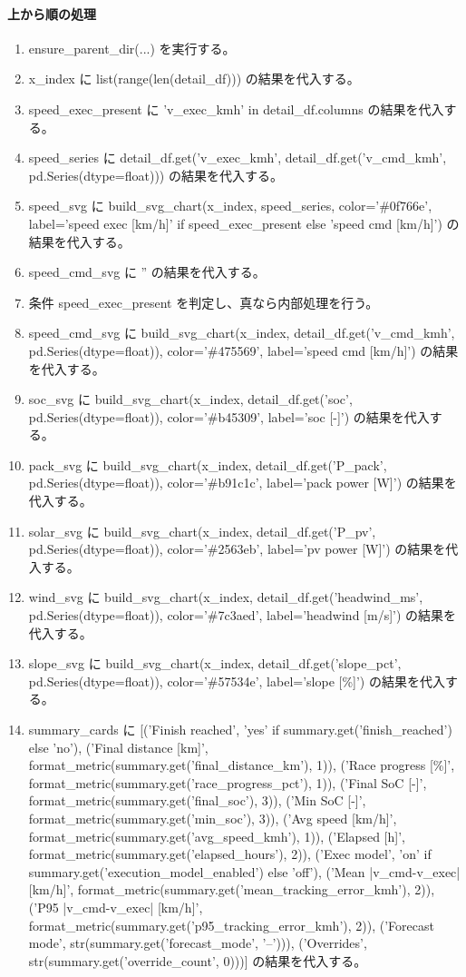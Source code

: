 \documentclass[a4paper,11pt]{article}
\begin{document}
            \paragraph{上から順の処理}
            \begin{enumerate}[leftmargin=1.8em]
            \item ensure\_parent\_dir(...) を実行する。
\item x\_index に list(range(len(detail\_df))) の結果を代入する。
\item speed\_exec\_present に 'v\_exec\_kmh' in detail\_df.columns の結果を代入する。
\item speed\_series に detail\_df.get('v\_exec\_kmh', detail\_df.get('v\_cmd\_kmh', pd.Series(dtype=float))) の結果を代入する。
\item speed\_svg に build\_svg\_chart(x\_index, speed\_series, color='\#0f766e', label='speed exec [km/h]' if speed\_exec\_present else 'speed cmd [km/h]') の結果を代入する。
\item speed\_cmd\_svg に '' の結果を代入する。
\item 条件 speed\_exec\_present を判定し、真なら内部処理を行う。
\item   speed\_cmd\_svg に build\_svg\_chart(x\_index, detail\_df.get('v\_cmd\_kmh', pd.Series(dtype=float)), color='\#475569', label='speed cmd [km/h]') の結果を代入する。
\item soc\_svg に build\_svg\_chart(x\_index, detail\_df.get('soc', pd.Series(dtype=float)), color='\#b45309', label='soc [-]') の結果を代入する。
\item pack\_svg に build\_svg\_chart(x\_index, detail\_df.get('P\_pack', pd.Series(dtype=float)), color='\#b91c1c', label='pack power [W]') の結果を代入する。
\item solar\_svg に build\_svg\_chart(x\_index, detail\_df.get('P\_pv', pd.Series(dtype=float)), color='\#2563eb', label='pv power [W]') の結果を代入する。
\item wind\_svg に build\_svg\_chart(x\_index, detail\_df.get('headwind\_ms', pd.Series(dtype=float)), color='\#7c3aed', label='headwind [m/s]') の結果を代入する。
\item slope\_svg に build\_svg\_chart(x\_index, detail\_df.get('slope\_pct', pd.Series(dtype=float)), color='\#57534e', label='slope [\%]') の結果を代入する。
\item summary\_cards に [('Finish reached', 'yes' if summary.get('finish\_reached') else 'no'), ('Final distance [km]', format\_metric(summary.get('final\_distance\_km'), 1)), ('Race progress [\%]', format\_metric(summary.get('race\_progress\_pct'), 1)), ('Final SoC [-]', format\_metric(summary.get('final\_soc'), 3)), ('Min SoC [-]', format\_metric(summary.get('min\_soc'), 3)), ('Avg speed [km/h]', format\_metric(summary.get('avg\_speed\_kmh'), 1)), ('Elapsed [h]', format\_metric(summary.get('elapsed\_hours'), 2)), ('Exec model', 'on' if summary.get('execution\_model\_enabled') else 'off'), ('Mean |v\_cmd-v\_exec| [km/h]', format\_metric(summary.get('mean\_tracking\_error\_kmh'), 2)), ('P95 |v\_cmd-v\_exec| [km/h]', format\_metric(summary.get('p95\_tracking\_error\_kmh'), 2)), ('Forecast mode', str(summary.get('forecast\_mode', '--'))), ('Overrides', str(summary.get('override\_count', 0)))] の結果を代入する。

\end{enumerate}
\end{document}
